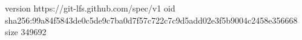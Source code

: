 version https://git-lfs.github.com/spec/v1
oid sha256:99a84f5843de0c5de9c7ba0d7f57c722c7c9d5add02e3f5b9004c2458e356668
size 349692
